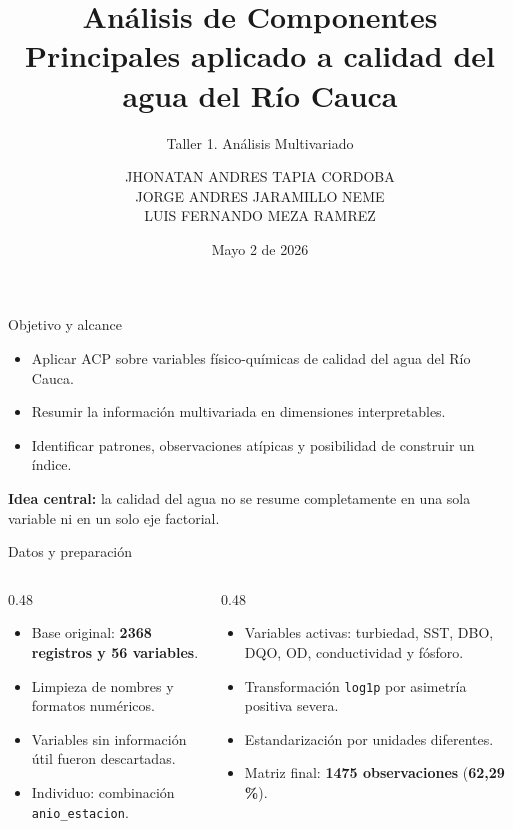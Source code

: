 \documentclass[aspectratio=169,11pt]{beamer}
\title[ACP calidad del agua]{Análisis de Componentes Principales aplicado a calidad del agua del Río Cauca}
\subtitle{Taller 1. Análisis Multivariado}
\author[J. Tapia, J. Jaramillo, L. Meza]{
JHONATAN ANDRES TAPIA CORDOBA\\
JORGE ANDRES JARAMILLO NEME\\
LUIS FERNANDO MEZA RAMREZ
}
\institute{Maestría en Inteligencia Artificial y Ciencia de Datos}
\date{Mayo 2 de 2026}
\begin{document}
\begin{frame}
  \titlepage
\end{frame}

\begin{frame}{Objetivo y alcance}
  \begin{itemize}
    \item Aplicar ACP sobre variables físico-químicas de calidad del agua del Río Cauca.
    \item Resumir la información multivariada en dimensiones interpretables.
    \item Identificar patrones, observaciones atípicas y posibilidad de construir un índice.
  \end{itemize}

  \vspace{0.25cm}
  \textbf{Idea central:} la calidad del agua no se resume completamente en una sola variable ni en un solo eje factorial.
\end{frame}

\begin{frame}{Datos y preparación}
  \begin{columns}[T]
    \begin{column}{0.48\textwidth}
      \begin{itemize}
        \item Base original: \textbf{2368 registros y 56 variables}.
        \item Limpieza de nombres y formatos numéricos.
        \item Variables sin información útil fueron descartadas.
        \item Individuo: combinación \texttt{anio\_estacion}.
      \end{itemize}
    \end{column}
    \begin{column}{0.48\textwidth}
      \begin{itemize}
        \item Variables activas: turbiedad, SST, DBO, DQO, OD, conductividad y fósforo.
        \item Transformación \texttt{log1p} por asimetría positiva severa.
        \item Estandarización por unidades diferentes.
        \item Matriz final: \textbf{1475 observaciones} (\textbf{62,29 \%}).
      \end{itemize}
    \end{column}
  \end{columns}
\end{frame}
\end{document}
